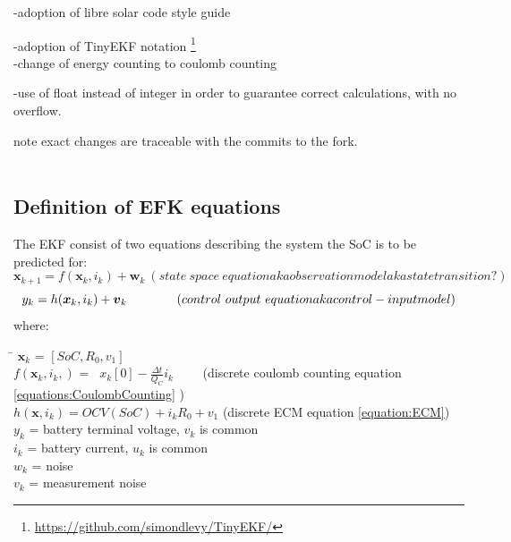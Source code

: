 -adoption of libre solar code style guide 

-adoption of TinyEKF notation  \footnote{\url{https://github.com/simondlevy/TinyEKF/}} \\
-change of energy counting to coulomb counting

-use of float instead of integer in order to guarantee correct calculations, with no overflow. 

note exact changes are traceable with the commits to the fork. 
\\
\
\
\


\subsection{Definition of EFK equations}
\label{System's dynamic model}


%


The EKF consist of two equations describing the system the SoC is to be predicted for:
\begin{equation}
  {\boldsymbol {x}}_{k+1}=f({\boldsymbol {x}}_{k},{{i}}_{k})+ {\boldsymbol {w}}_{k}  \ (state\ space\ equation aka observation model aka state transition ?)  
\end{equation}
\begin{equation}
 y_{k}=h({\boldsymbol  {x}}_{{k}}, {i}_{k})+{\boldsymbol  {v}}_{{k}}  \ \ \ \ \ \ \ \ \ \ \  \ (control\ output\ equation aka control-input model)  \\
\end{equation}
where: 
\begin{tabbing}
\phantom{$v(t)  \  \ \ \ \ \ \ \ \ \ \ \ \ \ \ \ \ \ $}\= \kill
$\boldsymbol x_{k}$\> = $[SoC, R_0, v_1]$ \\ 
$f({\boldsymbol {x}}_{k}, {i}_{k},)$\> =  \ $ {x}_{k}[0] - \frac{\Delta t}{Q_{C}} i_{k} $ \ \ \ \ (discrete coulomb counting equation \ref{equations:CoulombCounting} ) \\
$h(\boldsymbol x,i_k) = OCV(SoC) + i_k R_0  +  v_1$ (discrete ECM equation \ref{equation:ECM})\\
$y_{k}$\> =  battery terminal voltage,  $v_{k}$ is common  \\
$i_{k}$\> =   battery current, $u_{k}$ is common  \\
$w_{k}$\> = noise    \\ 
$v_{k}$\> = measurement noise    \\
\end{tabbing}	

